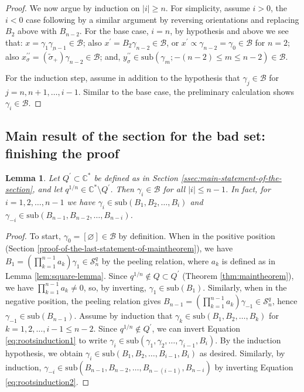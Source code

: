 \documentclass[12pt,
	]{amsart}
\newtheorem{lemma}[theorem]{Lemma}
\theoremstyle{definition}
\renewcommand{\bar}{\overline}
\renewcommand{\tilde}{\widetilde}
\renewcommand{\emptyset}{\varnothing}
\newcommand{\mrm}[1]{\mathrm{#1}}
\newcommand{\mbb}[1]{\mathbb{#1}}
\newcommand{\mcal}[1]{\mathcal{#1}}
\newcommand{\lp}{\left(}\newcommand{\rp}{\right)}
\newcommand{\sub}[1]{\mrm{sub}\lp#1\rp}
\newcommand{\class}[1]{\left[#1\right]}
\newcommand{\rev}[1]{\bar{#1}}
\newcommand{\lift}[1]{\tilde{#1}}
\newcommand{\C}{\mbb{C}}
\newcommand{\sC}{\C^\ast}
\newcommand{\sk}{\mcal{S}_n^q}
\newcommand{\badset}{Q}
\newcommand{\altbadset}{Q^\prime}
\newcommand{\qroot}{q^{1/n}}
\newcommand{\basgen}{\mcal{B}}
\begin{document}
\begin{proof}
We now argue by induction on $|i|\geq n$.  For simplicity, assume $i>0$, the $i<0$ case following by a similar argument by reversing orientations and replacing $B_2$ above with $B_{n-2}$.  For the base case, $i=n$, by hypothesis and above we see that: $x=\gamma_1\gamma_{n-1}\in\basgen$; also $x^\prime=B_2\gamma_{n-2}\in\basgen$, or $x^\prime\propto\gamma_{n-2}=\gamma_0\in\basgen$ for $n=2$; also $x^{\prime\prime}_\sigma=\rev{\lp\lift{\sigma}_+\rp}\gamma_{n-2}\in\basgen$; and, $y^{\prime\prime}_\sigma\in\sub{\gamma_m;-(n-2)\leq m\leq n-2}\in\basgen$.  

For the induction step, assume in addition to the hypothesis that $\gamma_j\in\basgen$ for $j=n,n+1,\dots,i-1$. Similar to the base case, the preliminary calculation shows $\gamma_{i}\in\basgen$.  \end{proof}

\subsection{Main result of the section for the bad set:  finishing the proof}\label{ssec:small-skeins}

\begin{lemma}\label{lem:small-skeins}
Let $\altbadset\subset\sC$ be defined as in Section {\upshape\ref{ssec:main-statement-of-the-section}}, and let $\qroot\in\sC\setminus\altbadset$.  Then $\gamma_i\in\basgen$ for all $|i|\leq n-1$.  In fact, for $i=1,2,\dots,n-1$ we have $\gamma_i\in\sub{B_1,B_2,\dots,B_i}$ and $\gamma_{-i}\in\sub{B_{n-1},B_{n-2},\dots,B_{n-i}}$.    
\end{lemma}

\begin{proof}
To start, $\gamma_0=\class{\emptyset}\in\basgen$ by definition.  When in the positive position (Section \ref{proof-of-the-last-statement-of-maintheorem}), we have $B_1=(\prod_{k=1}^{n-1}a_k)\gamma_1\in\sk$ by the peeling relation, where $a_k$ is defined as in Lemma \ref{lem:square-lemma}.  Since $\qroot\notin\badset\subset\altbadset$ (Theorem \ref{thm:maintheorem}), we have $\prod_{k=1}^{n-1}a_k\neq0$, so, by inverting, $\gamma_1\in\sub{B_1}$.  Similarly, when in the negative position, the peeling relation gives $B_{n-1}=(\prod_{k=1}^{n-1}a_k)\gamma_{-1}\in\sk$, hence $\gamma_{-1}\in\sub{B_{n-1}}$.  Assume by induction that $\gamma_k\in\sub{B_1,B_2,\dots,B_k}$ for $k=1,2,\dots,i-1\leq n-2$.  Since $\qroot\notin\altbadset$, we can invert Equation \eqref{eq:rootsinduction1} to write $\gamma_i\in\sub{\gamma_1,\gamma_2,\dots,\gamma_{i-1},B_i}$.  By the induction hypothesis, we obtain $\gamma_i\in\sub{B_1, B_2, \dots, B_{i-1}, B_i}$ as desired.  Similarly, by induction, $\gamma_{-i}\in\sub{B_{n-1}, B_{n-2}, \dots, B_{n-(i-1)}, B_{n-i}}$ by inverting Equation \eqref{eq:rootsinduction2}.  
\end{proof}
\end{document}
